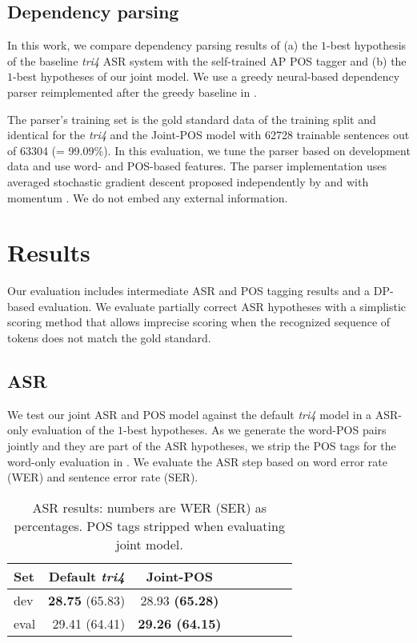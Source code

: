 \documentclass[11pt,letterpaper]{article}
\begin{document}
\subsection{Dependency parsing}\label{ssec:dp}
In this work, we compare dependency parsing results of (a) the $1$-best hypothesis of the baseline \emph{tri4} ASR system with the self-trained AP POS tagger and (b) the $1$-best hypotheses of our joint model. We use a greedy neural-based dependency parser reimplemented after the greedy baseline in \citet{WeissEtal:2015}. 

The parser's training set is the gold standard data of the training split and identical for the \emph{tri4} and the Joint-POS model with 62728 trainable sentences out of 63304 (= 99.09\%). In this evaluation, we tune the parser based on development data and use word- and POS-based features. The parser implementation uses averaged stochastic gradient descent proposed independently by \citet{Ruppert:1988} and \citet{PolyakJuditsky:1992} with momentum \citep{RumelhartEtal:1986}. We do not embed any external information.

\section{Results}\label{sec:results}

Our evaluation includes intermediate ASR and POS tagging results and a DP-based evaluation. We evaluate partially correct ASR hypotheses with a simplistic scoring method that allows imprecise scoring when the recognized sequence of tokens does not match the gold standard.

\subsection{ASR}
We test our joint ASR and POS model against the default \emph{tri4} model in a ASR-only evaluation of the $1$-best hypotheses. As we generate the word-POS pairs jointly and they are part of the ASR hypotheses, we strip the POS tags for the word-only evaluation in . We evaluate the ASR step based on word error rate (WER) and sentence error rate (SER).
\begin{table}[h]
    \centering
    \begin{tabular}{@{}lrcccccc@{}}
        \toprule
        Set                   & \multicolumn{1}{c}{Default \emph{tri4}} & \multicolumn{1}{c}{Joint-POS} \\ \midrule
        \multirow{1}{*}{dev}  & \textbf{28.75} (65.83) & 28.93 \textbf{(65.28)} \\ \midrule
        \multirow{1}{*}{eval} & 29.41 (64.41) & \textbf{29.26 (64.15)} \\ \bottomrule
    \end{tabular}
    \caption[ASR results: numbers are WER (SER).]{ASR results: numbers are WER (SER) as percentages. POS tags stripped when evaluating joint model.}
    \label{tab:asr}
\end{table}
\end{document}
